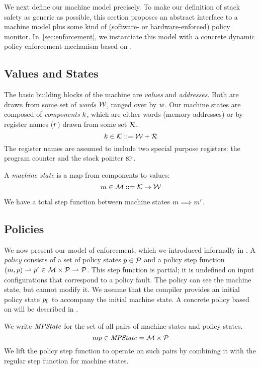 \documentclass[acmsmall,review,anonymous]{acmart}\settopmatter{printfolios=true,printccs=false,printacmref=false}
\begin{document}
We next define our machine model precisely. To make our definition of stack safety
as generic as possible, this section proposes an abstract interface to a
machine model plus some kind of (software- or hardware-enforced) policy monitor.
In~\cref{sec:enforcement}, we instantiate this model with a concrete dynamic
policy enforcement mechanism based on \citet{DBLP:conf/sp/RoesslerD18}.

\subsection{Values and States}

The basic building blocks of the machine are {\em values} and {\em addresses}.
Both are drawn from some set of {\em words} \({\mathcal W}\), ranged over by \(w\).
%
Our machine states are composed of {\em components} \(k\),
which are either words (memory addresses) or by register names (\(r\)) drawn from some set
\({\mathcal R}\).
%
    \[k \in {\mathcal K} ::= {\mathcal W} + {\mathcal R} \]
%
The register names are assumed to include two special purpose registers: the
program counter {\PCname} and the stack pointer \(\textsc{sp}\).

A {\em machine state} is a map from components to values:
%
\[m \in {\mathcal M} ::= {\mathcal K} \rightarrow {\mathcal W}\]

We have a total step function between machine states \(m \Longrightarrow m'\).

\subsection{Policies}

We now present our model of enforcement, which we introduced informally in .
A {\em policy} consists of a set of policy
states \(p \in \mathcal{P}\) and a policy step function \((m, p) \rightharpoonup p' \in
{\mathcal M} \times \mathcal{P} \rightharpoonup \mathcal{P}\). This step function is partial;
it is undefined on input configurations that correspond to a policy fault. The policy
can see the machine state, but cannot modify it. We assume that the
compiler provides an initial policy state \(p_0\) to accompany the initial machine state.
%
A concrete policy based on \citet{DBLP:conf/sp/RoesslerD18} will be described in
.

We write $\mathit{MPState}$ for the set of all pairs of machine states and policy
states.
%
\[mp \in \mathit{MPState} = {\mathcal M} \times \mathcal{P}\]
%
We lift the policy step function to operate on such pairs
by combining it with the regular step function for machine states.
\end{document}

